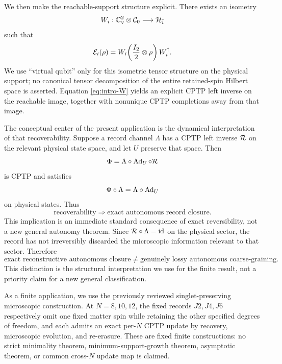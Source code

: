 We then make the reachable-support structure explicit.  There exists an isometry
\begin{equation}
  W_i:\mathbb C^2_{\mathrm v}\otimes\mathcal C_0\longrightarrow\mathcal H_{\bar i}
\end{equation}
such that
\begin{equation}
  \mathcal E_i(\rho)
  =W_i\!\left(\frac{I_2}{2}\otimes\rho\right)W_i^\dagger.
  \label{eq:intro-W}
\end{equation}
We use ``virtual qubit'' only for this isometric tensor structure on the physical support; no canonical tensor decomposition of the entire retained-spin Hilbert space is asserted.  Equation \eqref{eq:intro-W} yields an explicit CPTP left inverse on the reachable image, together with nonunique CPTP completions away from that image.

The conceptual center of the present application is the dynamical interpretation of that recoverability.  Suppose a record channel $\Lambda$ has a CPTP left inverse $\mathcal R$ on the relevant physical state space, and let $U$ preserve that space.  Then
\begin{equation}
  \Phi=\Lambda\circ\operatorname{Ad}_U\circ\mathcal R
  \label{eq:intro-phi}
\end{equation}
is CPTP and satisfies
\begin{equation}
  \Phi\circ\Lambda=\Lambda\circ\operatorname{Ad}_U
\end{equation}
on physical states.  Thus
\begin{equation}
  \boxed{\text{recoverability}\Rightarrow\text{exact autonomous record closure}.}
\end{equation}
This implication is an immediate standard consequence of exact reversibility, not a new general autonomy theorem.  Since $\mathcal R\circ\Lambda=\operatorname{id}$ on the physical sector, the record has not irreversibly discarded the microscopic information relevant to that sector.  Therefore
\begin{equation}
  \boxed{\text{exact reconstructive autonomous closure}
  \neq
  \text{genuinely lossy autonomous coarse-graining}.}
\end{equation}
This distinction is the structural interpretation we use for the finite result, not a priority claim for a new general classification.

As a finite application, we use the previously reviewed singlet-preserving microscopic construction.  At $N=8,10,12$, the fixed records $J2,J4,J6$ respectively omit one fixed matter spin while retaining the other specified degrees of freedom, and each admits an exact per-$N$ CPTP update by recovery, microscopic evolution, and re-erasure.  These are fixed finite constructions: no strict minimality theorem, minimum-support-growth theorem, asymptotic theorem, or common cross-$N$ update map is claimed.


